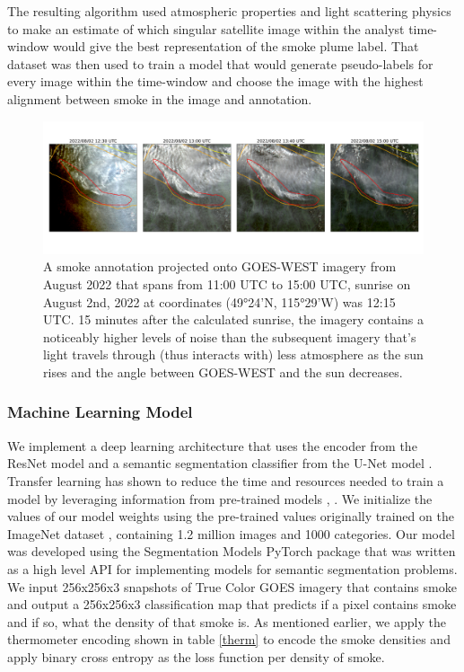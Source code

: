 \documentclass{article}
\begin{document}
The resulting algorithm used atmospheric properties and light scattering physics to make an estimate of which singular satellite image within the analyst time-window would give the best representation of the smoke plume label. That dataset was then used to train a model that would generate pseudo-labels for every image within the time-window and choose the image with the highest alignment between smoke in the image and annotation.


\begin{figure}
    \centering
    \includegraphics[width=16cm]{figures/timelapse_G17_2.png}
    \caption{A smoke annotation projected onto GOES-WEST imagery from August 2022 that spans from 11:00 UTC to 15:00 UTC, sunrise on August 2nd, 2022 at coordinates (49°24'N, 115°29'W) was 12:15 UTC. 15 minutes after the calculated sunrise, the imagery contains a noticeably higher levels of noise than the subsequent imagery that's light travels through (thus interacts with) less atmosphere as the sun rises and the angle between GOES-WEST and the sun decreases. }\label{G17_sunrise}
\end{figure}




\subsubsection*{Machine Learning Model} 

We implement a deep learning architecture that uses the encoder from the ResNet model \citep{resnet} and a semantic segmentation classifier from the U-Net model \citep{unet}. Transfer learning has shown to reduce the time and resources needed to train a model by leveraging information from pre-trained models \citep{transfer}, \citep{transfer2}.  We initialize the values of our model weights using the pre-trained values originally trained on the ImageNet dataset \citep{imgnet}, containing 1.2 million images and 1000 categories. Our model was developed using the Segmentation Models PyTorch package \citep{semantic} that was written as a high level API for implementing models for semantic segmentation problems.  We input 256x256x3 snapshots of True Color GOES imagery that contains smoke and output a 256x256x3 classification map that predicts if a pixel contains smoke and if so, what the density of that smoke is. As mentioned earlier, we apply the thermometer encoding shown in table \ref{therm} to encode the smoke densities and apply binary cross entropy as the loss function per density of smoke. 
\end{document}
